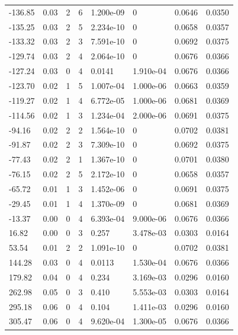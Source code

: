 \documentclass[preview]{standalone}
\begin{document}
{{\begin{tabular}{L{1.2cm}C{1.2cm} C{0.3cm}C{0.5cm} C{1.4cm}C{1.4cm} C{1.4cm}C{1.4cm}}
  -136.85  &  0.03  & 2     &  6 &  1.200e-09  & 0  & 0.0646 &  0.0350   \\ 
  -135.25  &  0.03  & 2     &  5 &  2.234e-10  & 0  & 0.0658 &  0.0357   \\ 
  -133.32  &  0.03  & 2     &  3 &  7.591e-10  & 0  & 0.0692 &  0.0375   \\ 
  -129.74  &  0.03  & 2     &  4 &  2.064e-10  & 0  & 0.0676 &  0.0366   \\ 
  -127.24  &  0.03  & 0     &  4 &  0.0141  & 1.910e-04  & 0.0676 &  0.0366   \\ 
  -123.70  &  0.02  & 1     &  5 &  1.007e-04  & 1.000e-06  & 0.0663 &  0.0359   \\ 
  -119.27  &  0.02  & 1     &  4 &  6.772e-05  & 1.000e-06  & 0.0681 &  0.0369   \\ 
  -114.56  &  0.02  & 1     &  3 &  1.234e-04  & 2.000e-06  & 0.0691 &  0.0375   \\ 
  -94.16  &  0.02  & 2     &  2 &  1.564e-10  & 0  & 0.0702 &  0.0381   \\ 
  -91.87  &  0.02  & 2     &  3 &  7.309e-10  & 0  & 0.0692 &  0.0375   \\ 
  -77.43  &  0.02  & 2     &  1 &  1.367e-10  & 0  & 0.0701 &  0.0380   \\ 
  -76.15  &  0.02  & 2     &  5 &  2.172e-10  & 0  & 0.0658 &  0.0357   \\ 
  -65.72  &  0.01  & 1     &  3 &  1.452e-06  & 0  & 0.0691 &  0.0375   \\ 
  -29.45  &  0.01  & 1     &  4 &  1.370e-09  & 0  & 0.0681 &  0.0369   \\ 
  -13.37  &  0.00  & 0     &  4 &  6.393e-04  & 9.000e-06  & 0.0676 &  0.0366   \\ 
  16.82  &  0.00  & 0     &  3 &  0.257  & 3.478e-03  & 0.0303 &  0.0164   \\ 
  53.54  &  0.01  & 2     &  2 &  1.091e-10  & 0  & 0.0702 &  0.0381   \\ 
  144.28  &  0.03  & 0     &  4 &  0.0113  & 1.530e-04  & 0.0676 &  0.0366   \\ 
  179.82  &  0.04  & 0     &  4 &  0.234  & 3.169e-03  & 0.0296 &  0.0160   \\ 
  262.98  &  0.05  & 0     &  3 &  0.410  & 5.553e-03  & 0.0303 &  0.0164   \\ 
  295.18  &  0.06  & 0     &  4 &  0.104  & 1.411e-03  & 0.0296 &  0.0160   \\ 
  305.47  &  0.06  & 0     &  4 &  9.620e-04  & 1.300e-05  & 0.0676 &  0.0366   \\ 

\end{tabular}}}
\end{document}
